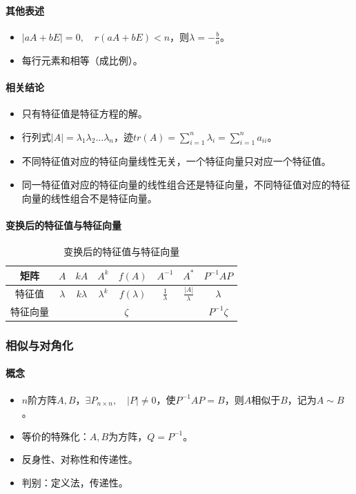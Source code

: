 \documentclass[
12pt, %
a4paper, 
oneside, %
]{scrartcl}
\begin{document}
\paragraph{其他表述}
\begin{itemize}
\item $ |aA + bE| = 0, \quad r(aA + bE) < n $，则$ \lambda = -\frac{b}{a} $。
\item 每行元素和相等（成比例）。
\end{itemize}
\paragraph{相关结论}
\begin{itemize}
\item 只有特征值是特征方程的解。
\item 行列式$ |A| = \lambda_1 \lambda_2 \dots \lambda_n $，迹$ tr(A) = \sum_{i = 1}^n \lambda_i = \sum_{i = 1}^n a_{ii} $。
\item 不同特征值对应的特征向量线性无关，一个特征向量只对应一个特征值。
\item 同一特征值对应的特征向量的线性组合还是特征向量，不同特征值对应的特征向量的线性组合不是特征向量。
\end{itemize}
\paragraph{变换后的特征值与特征向量}
\begin{table}[H]
\centering
\begin{tabular}{|c|c|c|c|c|c|c|c|}
\hline
矩阵 & $ A $ & $ kA $ & $ A^k $ & $ f(A) $ & $ A^{-1} $ & $ A^* $ & $ P^{-1} AP $ \\
\hline
特征值 & $ \lambda $ & $ k\lambda $ & $ \lambda^k $ & $ f(\lambda) $ & $ \frac{1}{\lambda} $ & $ \frac{|A|}{\lambda} $ & $ \lambda $ \\
\hline
特征向量 & \multicolumn{6}{c|}{$ \zeta $} & $ P^{-1}\zeta $ \\
\hline
\end{tabular}
\caption{变换后的特征值与特征向量}
\end{table} 
\subsubsection[相似与对角化]{相似与对角化}
\paragraph{概念}
\begin{itemize}
\item $ n $阶方阵$ A, B $，$ \exists P_{n \times n}, \quad |P| \neq 0 $，使$ P^{-1} AP = B $，则$ A $相似于$ B $，记为$ A \sim B $。
\item 等价的特殊化：$ A, B $为方阵，$ Q = P^{-1} $。
\item 反身性、对称性和传递性。
\item 判别：定义法，传递性。
\end{itemize}
\end{document}
